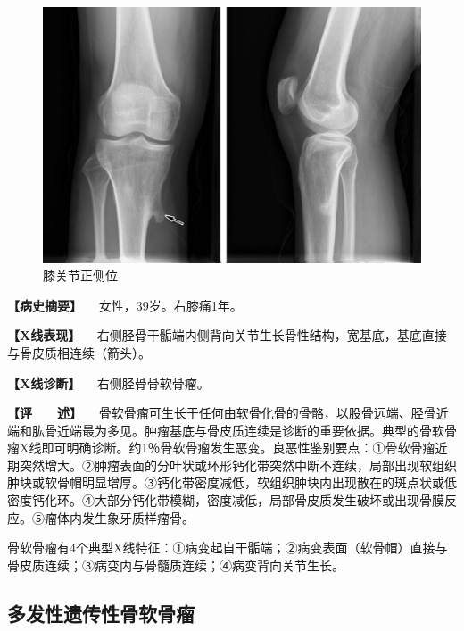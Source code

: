 \begin{figure}[!htbp]
 \centering
 \includegraphics{./images/Image00087.jpg}
 \captionsetup{justification=centering}
 \caption{膝关节正侧位}
 \label{fig2-7-2}
  \end{figure} 

\textbf{【病史摘要】} 　女性，39岁。右膝痛1年。

\textbf{【X线表现】}
　右侧胫骨干骺端内侧背向关节生长骨性结构，宽基底，基底直接与骨皮质相连续（箭头）。

\textbf{【X线诊断】} 　右侧胫骨骨软骨瘤。

\textbf{【评　　述】}
　骨软骨瘤可生长于任何由软骨化骨的骨骼，以股骨远端、胫骨近端和肱骨近端最为多见。肿瘤基底与骨皮质连续是诊断的重要依据。典型的骨软骨瘤X线即可明确诊断。约1％骨软骨瘤发生恶变。良恶性鉴别要点：①骨软骨瘤近期突然增大。②肿瘤表面的分叶状或环形钙化带突然中断不连续，局部出现软组织肿块或软骨帽明显增厚。③钙化带密度减低，软组织肿块内出现散在的斑点状或低密度钙化环。④大部分钙化带模糊，密度减低，局部骨皮质发生破坏或出现骨膜反应。⑤瘤体内发生象牙质样瘤骨。

骨软骨瘤有4个典型X线特征：①病变起自干骺端；②病变表面（软骨帽）直接与骨皮质连续；③病变内与骨髓质连续；④病变背向关节生长。

\subsection{多发性遗传性骨软骨瘤}

